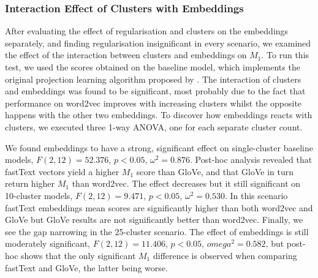 \subsubsection{Interaction Effect of Clusters with Embeddings}
After evaluating the effect of regularisation and clusters on the embeddings separately, and finding  regularisation insignificant in every scenario, we examined the effect of the interaction between clusters and embeddings on $M_1$.  To run this test, we used the scores obtained on the baseline model, which implements the original projection learning algorithm proposed by \citet{Fu2014}.  The interaction of clusters and embeddings was found to be significant, most probably due to the fact that performance on word2vec improves with increasing clusters whilst the opposite happens with the other two embeddings. To discover how embeddings reacts with clusters, we executed three 1-way \ac{ANOVA}, one for each separate cluster count.  

We found embeddings to have a strong, significant effect on single-cluster baseline models, $F(2,12)=52.376$, $p < 0.05$, $\omega^2=0.876$.  Post-hoc analysis revealed that fastText vectors yield a higher $M_1$ score than GloVe, and that GloVe in turn return higher $M_1$ than word2vec.  The effect decreases but it still significant on 10-cluster models, $F(2,12)=9.471$, $p < 0.05$, $\omega^2=0.530$.  In this scenario fastText embeddings mean scores are significantly higher than both word2vec and GloVe but GloVe results are not significantly better than word2vec.  Finally, we see the gap narrowing in the 25-cluster scenario.  The effect of embeddings is still moderately significant, $F(2,12)=11.406$, $p < 0.05$, $omega^2=0.582$, but post-hoc shows that the only significant $M_1$ difference is observed when comparing fastText and GloVe, the latter being worse.  

